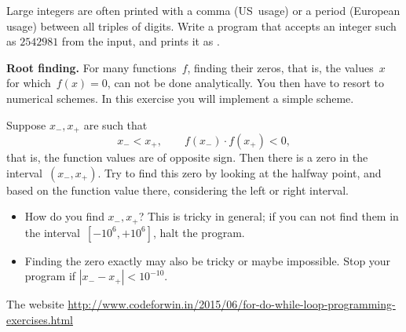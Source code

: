 \begin{exercise}
  Large integers are often printed with a comma (US~usage) or a period
  (European usage) between all triples of digits. Write a program that
  accepts an integer such as $2542981$ from the input, and prints it as
  .
\end{exercise}

\begin{exercise}
  \label{ex:rootfind}
  \textbf{Root finding.}
  For many functions~$f$, finding their zeros, that is, the values~$x$
  for which~$f(x)=0$, can not be done analytically. You then have to
  resort to numerical  schemes. In this
  exercise you will implement a simple scheme.

  Suppose $x_-,x_+$ are such that 
  \[ x_-<x_+,\qquad f(x_-)\cdot f(x_+)<0,\]
  that is, the function values are of opposite sign. Then
  there is a zero in the interval~$(x_-,x_+)$. Try to find this zero
  by looking at the halfway point, and based on the function value
  there, considering the left or right interval.
  \begin{itemize}
  \item How do you find $x_-,x_+$? This is tricky in general; if you
    can not find them in the interval~$[-10^6,+10^6]$, halt the program.
  \item Finding the zero exactly may also be tricky or maybe
    impossible. Stop your program if $|x_--x_+|<10^{-10}$.
  \end{itemize}
\end{exercise}

The website
\url{http://www.codeforwin.in/2015/06/for-do-while-loop-programming-exercises.html}

\begin{comment}
  \begin{multicols}{2}
    \begin{lstlisting}
    \end{lstlisting}
    \columnbreak
    \begin{lstlisting}
    \end{lstlisting}
  \end{multicols}
  \begin{multicols}{2}
    \begin{lstlisting}
    \end{lstlisting}
    \columnbreak
    \begin{lstlisting}
    \end{lstlisting}
  \end{multicols}
\end{comment}

